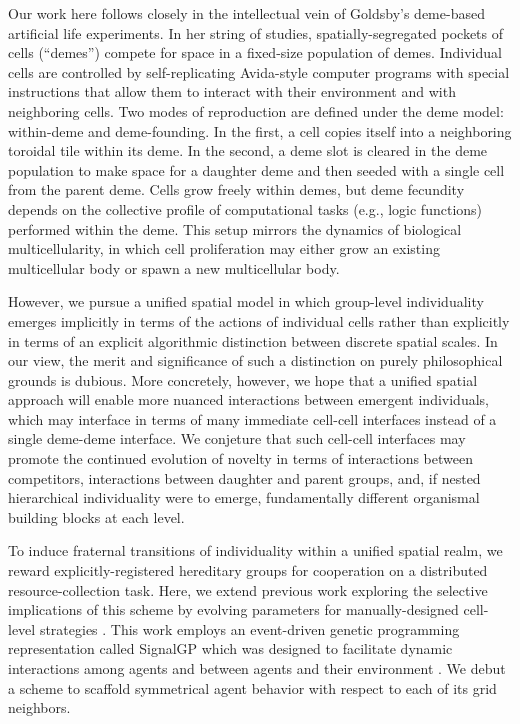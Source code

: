 Our work here follows closely in the intellectual vein of Goldsby's deme-based artificial life experiments.
In her string of studies, spatially-segregated pockets of cells (``demes'') compete for space in a fixed-size population of demes.
Individual cells are controlled by self-replicating Avida-style computer programs with special instructions that allow them to interact with their environment and with neighboring cells.
Two modes of reproduction are defined under the deme model: within-deme and deme-founding.
In the first, a cell copies itself into a neighboring toroidal tile within its deme.
In the second, a deme slot is cleared in the deme population to make space for a daughter deme and then seeded with a single cell from the parent deme.
Cells grow freely within demes, but deme fecundity depends on the collective profile of computational tasks (e.g., logic functions) performed within the deme.
This setup mirrors the dynamics of biological multicellularity, in which cell proliferation may either grow an existing multicellular body or spawn a new multicellular body.

However, we pursue a unified spatial model in which group-level individuality emerges implicitly in terms of the actions of individual cells rather than explicitly in terms of an explicit algorithmic distinction between discrete spatial scales.
In our view, the merit and significance of such a distinction on purely philosophical grounds is dubious.
More concretely, however, we hope that a unified spatial approach will enable more nuanced interactions between emergent individuals, which may interface in terms of many immediate cell-cell interfaces instead of a single deme-deme interface.
We conjeture that such cell-cell interfaces may promote the continued evolution of novelty in terms of interactions between competitors, interactions between daughter and parent groups, and, if nested hierarchical individuality were to emerge, fundamentally different organismal building blocks at each level.

To induce fraternal transitions of individuality within a unified spatial realm, we reward explicitly-registered hereditary groups for cooperation on a distributed resource-collection task.
Here, we extend previous work exploring the selective implications of this scheme by evolving parameters for manually-designed cell-level strategies \citep{moreno2019toward}.
This work employs an event-driven genetic programming representation called SignalGP which was designed to facilitate dynamic interactions among agents and between agents and their environment \citep{lalejini2018evolving}.
We debut a scheme to scaffold symmetrical agent behavior with respect to each of its grid neighbors.
